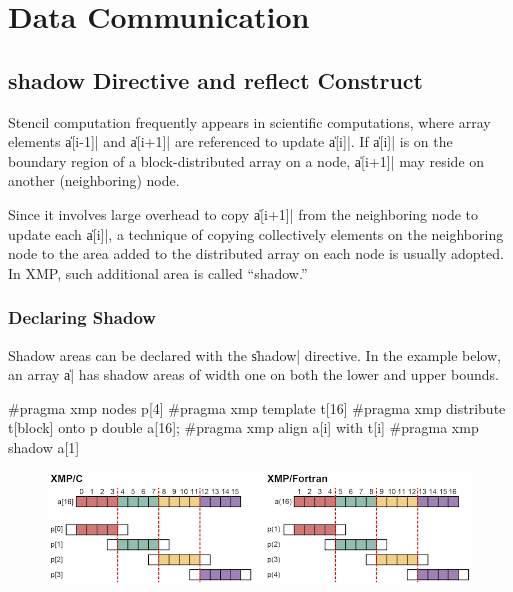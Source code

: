 \section{Data Communication}

\subsection{{\bf shadow} Directive and {\bf reflect} Construct}

Stencil computation frequently appears in scientific computations,
where array elements \|a[i-1]| and \|a[i+1]| are referenced to update
\|a[i]|. If \|a[i]| is on the boundary region of a block-distributed
array on a node, \|a[i+1]| may reside on another (neighboring) node.

Since it involves large overhead to copy \|a[i+1]| from the neighboring node to
update each \|a[i]|, a technique of copying collectively elements on the
neighboring node to the area added to the distributed array on each node
is usually adopted. In XMP, such additional area is called ``shadow.''

\subsubsection{Declaring Shadow}


Shadow areas can be declared with the \|shadow| directive. In the example
below, an array \|a| has shadow areas of width one on both the lower and
upper bounds.

\begin{XCexample}
#pragma xmp nodes p[4]
#pragma xmp template t[16]
#pragma xmp distribute t[block] onto p
double a[16];
#pragma xmp align a[i] with t[i]
#pragma xmp shadow a[1]
\end{XCexample}


\begin{figure}
  \centering
  \includegraphics[width=\textwidth]{figs/shadow.png}
\end{figure}

